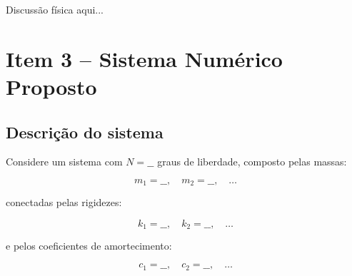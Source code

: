 \documentclass[12pt,a4paper]{article}
\begin{document}

Discussão física aqui...

\section{Item 3 -- Sistema Numérico Proposto}


\subsection{Descrição do sistema}

Considere um sistema com $N = \_\_$ graus de liberdade, composto pelas massas:

\begin{equation}
    m_1 = \_\_, \quad m_2 = \_\_, \quad \ldots
\end{equation}

\noindent conectadas pelas rigidezes:

\begin{equation}
    k_1 = \_\_, \quad k_2 = \_\_, \quad \ldots
\end{equation}

\noindent e pelos coeficientes de amortecimento:

\begin{equation}
    c_1 = \_\_, \quad c_2 = \_\_, \quad \ldots
\end{equation}

\end{document}
